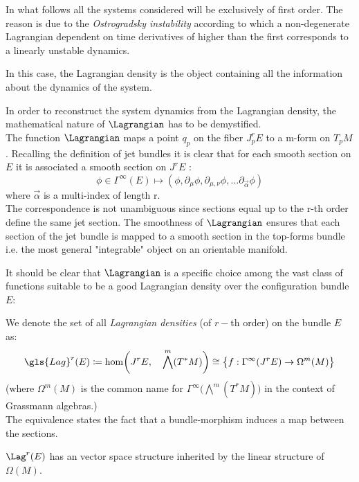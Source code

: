 \documentclass[Main]{subfiles}
\begin{document}
	\begin{NB}
	
		In what follows all the systems considered will be exclusively of first order.
		The reason is due to the \emph{Ostrogradsky instability} according to which a non-degenerate Lagrangian dependent on time derivatives of higher than the first corresponds to a linearly unstable dynamics.\cite{Motohashi2014}
	\end{NB}		
	In this case, the Lagrangian density is the object containing all the information about the dynamics of the system.

	\vspace{3mm}
	In order to reconstruct the system dynamics from the Lagrangian density, the mathematical nature of $\Lagrangian$  has to be demystified.\\
	The function $\Lagrangian$ maps a point $q_p$ on the fiber $J^r_p E$ to a m-form on $T_p M$.
	Recalling the definition of jet bundles it is clear that for each smooth section on $E$ it is associated a smooth section on $J^rE$ :
	\begin{displaymath}
		\phi \in \Gamma^\infty (E) \mapsto (\phi, \partial_\mu \phi, \partial_{\mu, \nu} \phi , \ldots \partial_{\vec{\alpha}}\phi)
	\end{displaymath}
	where  $\vec{\alpha}$ is a multi-index of length r.
	\\
	The correspondence is not unambiguous since sections equal up to the r-th order define the same jet section.
	The smoothness of $\Lagrangian$ ensures that each section of the jet bundle is mapped to a smooth section in the top-forms bundle i.e. the most general "integrable" object on an orientable manifold.
	
	\vspace{3mm}
	It should be clear that $\Lagrangian$ is a specific choice among the vast class of functions suitable to be a good Lagrangian density over the  configuration bundle $E$:
	\begin{definition}\label{Def:LagrangianDensities}
		We denote the set of all \emph{Lagrangian densities} (of $r-$th order) on the bundle $E$ as:
		\begin{displaymath}
			\gls{Lag}^r (E) \coloneqq \hom\biggr(J^r E,\quad \bigwedge^m( T^*M)\biggr)  \cong \big\{f:\Gamma^\infty(J^r E) \rightarrow \Omega^m(M)  \big\}
		\end{displaymath}
	(where $\Omega^m(M)$ is the common name for $\Gamma^\infty \big( \bigwedge^m( T^*M) \big)$ in the context of Grassmann algebras.)\\
	The equivalence states the fact that a bundle-morphism induces a map between the sections.
	\end{definition}
	\begin{proposition}
		$\Lag^r(E)$ has an vector space structure inherited by the linear structure of $\Omega(M)$.
	\end{proposition}
	
\end{document}
